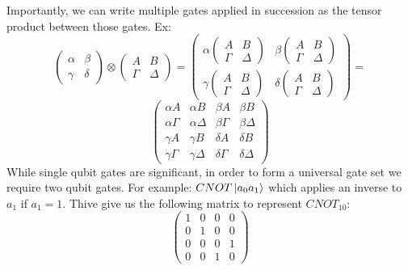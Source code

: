 \documentclass{article}
\begin{document}
Importantly, we can write multiple gates applied in succession as the tensor product between those gates. Ex:
\[
    \begin{pmatrix}
        \alpha & \beta\\
        \gamma & \delta
    \end{pmatrix}
    \otimes
    \begin{pmatrix}
        A & B\\
        \Gamma & \Delta
    \end{pmatrix}
    =
    \begin{pmatrix}
        \alpha 
        \begin{pmatrix}
            A & B\\
            \Gamma & \Delta
        \end{pmatrix} 
        & \beta
        \begin{pmatrix}
            A & B\\
            \Gamma & \Delta
        \end{pmatrix}
        \\
        \gamma
            \begin{pmatrix}
            A & B\\
            \Gamma & \Delta
        \end{pmatrix}
        & \delta
        \begin{pmatrix}
            A & B\\
            \Gamma & \Delta
        \end{pmatrix}
    \end{pmatrix}
    =
\]
\[
    \begin{pmatrix}
        \alpha A      & \alpha B      & \beta A      & \beta   B      \\
        \alpha \Gamma & \alpha \Delta & \beta \Gamma & \beta   \Delta \\
        \gamma A      & \gamma B      & \delta A     & \delta  B      \\
        \gamma \Gamma & \gamma \Delta & \delta \Gamma & \delta \Delta         
    \end{pmatrix}
\]
While single qubit gates are significant, in order to form a universal gate set we require two qubit gates. For example: $CNOT\ket{a_0a_1}$ which applies an inverse to $a_1$ if $a_1 = 1$. Thive give us the following matrix to represent $CNOT_{10}$:
\[
    \begin{pmatrix}
        1 & 0 & 0 & 0 \\
        0 & 1 & 0 & 0 \\
        0 & 0 & 0 & 1 \\
        0 & 0 & 1 & 0 
    \end{pmatrix}
\]
\end{document}

